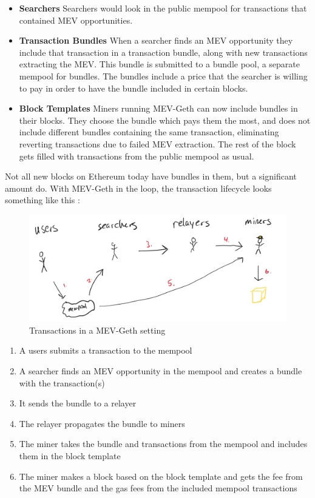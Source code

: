\begin{itemize}
    \item \textbf{Searchers} Searchers would look in the public mempool for transactions that contained MEV opportunities.
    \item \textbf{Transaction Bundles} When a searcher finds an MEV opportunity they include that transaction in a transaction bundle, along with new transactions extracting the MEV. This bundle is submitted to a bundle pool, a separate mempool for bundles. The bundles include a price that the searcher is willing to pay in order to have the bundle included in certain blocks.
    \item \textbf{Block Templates} Miners running MEV-Geth can now include bundles in their blocks. They choose the bundle which pays them the most, and does not include different bundles containing the same transaction, eliminating reverting transactions due to failed MEV extraction. The rest of the block gets filled with transactions from the public mempool as usual.
\end{itemize}

Not all new blocks on Ethereum today have bundles in them, but a significant amount do. With MEV-Geth in the loop, the transaction lifecycle looks something like this \cite{auctionoverview}:


\begin{figure}[H]
    \centering
    \includegraphics[width=\textwidth]{3_FIGURES/Theory/mevgeth.PNG}
    \caption{Transactions in a MEV-Geth setting}
    \label{mevgeth}
\end{figure}

\begin{enumerate}
    \item A users submits a transaction to the mempool
    \item A searcher finds an MEV opportunity in the mempool and creates a bundle with the transaction(s)
    \item It sends the bundle to a relayer
    \item The relayer propagates the bundle to miners
    \item The miner takes the bundle and transactions from the mempool and includes them in the block template
    \item The miner makes a block based on the block template and gets the fee from the MEV bundle and the gas fees from the included mempool transactions
\end{enumerate}


